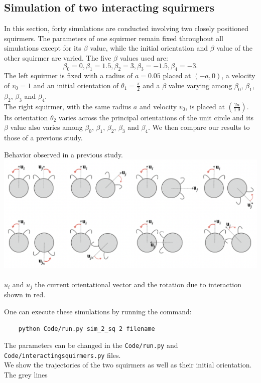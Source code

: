 \documentclass{article}
\begin{document}
\subsection{Simulation of two interacting squirmers}
In this section, forty simulations are conducted involving two closely positioned squirmers. 
The parameters of one squirmer remain fixed throughout all simulations except for its $\beta$ value, while 
the initial orientation and $\beta$ value of the other squirmer are varied. The five $\beta$ values used are:
$$\beta_0 = 0, \beta_1 = 1.5, \beta_2 = 3, \beta_3 = -1.5, \beta_4 = -3.$$ 
The left squirmer is fixed with a radius of $a=0.05$ placed at $(-a, 0)$, a velocity of $v_0=1$ and an initial orientation
of $\theta_1 = \frac{\pi}{2}$ and a $\beta$ value varying among $\beta_0$, $\beta_1$, $\beta_2$, $\beta_3$ and $\beta_4$.\\
The right squirmer, with the same radius $a$ and velocity $v_0$, is placed at $(\frac{2a}{1.9})$. Its orientation $\theta_2$
varies across the principal orientations of the unit circle and its $\beta$ value also varies among $\beta_0$, $\beta_1$, $\beta_2$, $\beta_3$ and $\beta_4$.
We then compare our results to those of a previous study.
\begin{center}
    Behavior observed in a previous study.
    \includegraphics[width=1\textwidth]{Presentation/images/stark_behavior.png}\\
    \cite{Stark}\\
    $u_i$ and $u_j$ the current orientational vector and the rotation due to interaction shown in red.  
 \end{center}
 One can execute these simulations by running the command:
 \begin{verbatim}
    python Code/run.py sim_2_sq 2 filename
 \end{verbatim}
 The parameters can be changed in the \texttt{Code/run.py} and \texttt{Code/interactingsquirmers.py} files.\\
 We show the trajectories of the two squirmers as well as their initial orientation. The grey lines 
\end{document}
